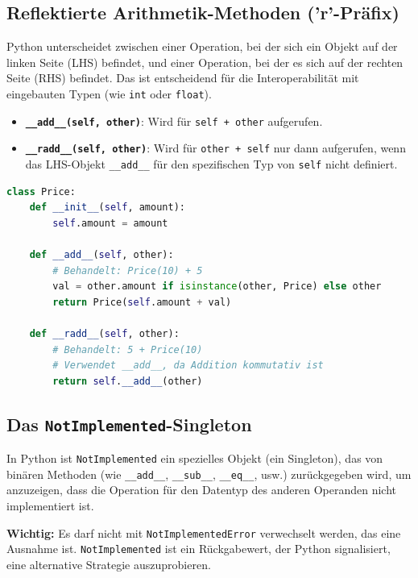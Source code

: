 \subsection{Reflektierte Arithmetik-Methoden ('r'-Präfix)}
Python unterscheidet zwischen einer Operation, bei der sich ein Objekt auf der linken Seite (LHS) befindet, und einer Operation, bei der es sich auf der rechten Seite (RHS) befindet. Das ist entscheidend für die Interoperabilität mit eingebauten Typen (wie \texttt{int} oder \texttt{float}).

\begin{itemize}
    \item \textbf{\texttt{\_\_add\_\_(self, other)}}: Wird für \texttt{self + other} aufgerufen.
    \item \textbf{\texttt{\_\_radd\_\_(self, other)}}: Wird für \texttt{other + self} nur dann aufgerufen, wenn das LHS-Objekt \texttt{\_\_add\_\_} für den spezifischen Typ von \texttt{self} nicht definiert.
\end{itemize}

\begin{lstlisting}[language=Python]
class Price:
    def __init__(self, amount):
        self.amount = amount

    def __add__(self, other):
        # Behandelt: Price(10) + 5
        val = other.amount if isinstance(other, Price) else other
        return Price(self.amount + val)

    def __radd__(self, other):
        # Behandelt: 5 + Price(10)
        # Verwendet __add__, da Addition kommutativ ist
        return self.__add__(other)
\end{lstlisting}

\subsection{Das \texttt{NotImplemented}-Singleton}
In Python ist \texttt{NotImplemented} ein spezielles Objekt (ein Singleton), das von binären Methoden (wie \texttt{\_\_add\_\_}, \texttt{\_\_sub\_\_}, \texttt{\_\_eq\_\_}, usw.) zurückgegeben wird, um anzuzeigen, dass die Operation für den Datentyp des anderen Operanden nicht implementiert ist.

\textbf{Wichtig:} Es darf nicht mit \texttt{NotImplementedError} verwechselt werden, das eine Ausnahme ist. \texttt{NotImplemented} ist ein Rückgabewert, der Python signalisiert, eine alternative Strategie auszuprobieren.